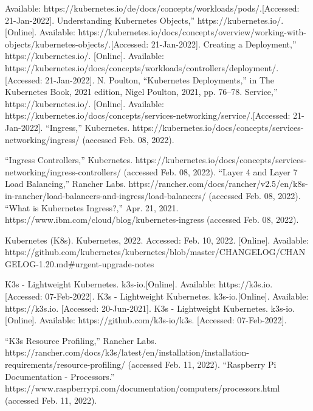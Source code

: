\begin{thebibliography}{10}
  Available: https://kubernetes.io/de/docs/concepts/workloads/pods/.[Accessed: 21-Jan-2022].
   Understanding Kubernetes Objects,” https://kubernetes.io/. [Online]. 
  Available: https://kubernetes.io/docs/concepts/overview/working-with-objects/kubernetes-objects/.[Accessed: 21-Jan-2022].  
   Creating a Deployment,” https://kubernetes.io/. [Online]. 
  Available: https://kubernetes.io/docs/concepts/workloads/controllers/deployment/.[Accessed: 21-Jan-2022].
   N. Poulton, “Kubernetes Deployments,” in The Kubernetes Book, 2021 edition, Nigel Poulton, 2021, pp. 76–78. 
   Service,” https://kubernetes.io/. [Online]. 
  Available: https://kubernetes.io/docs/concepts/services-networking/service/.[Accessed: 21-Jan-2022].
  “Ingress,” Kubernetes. https://kubernetes.io/docs/concepts/services-networking/ingress/ (accessed Feb. 08, 2022).

  “Ingress Controllers,” Kubernetes. https://kubernetes.io/docs/concepts/services-networking/ingress-controllers/ (accessed Feb. 08, 2022).
  “Layer 4 and Layer 7 Load Balancing,” Rancher Labs. https://rancher.com/docs/rancher/v2.5/en/k8s-in-rancher/load-balancers-and-ingress/load-balancers/ (accessed Feb. 08, 2022).
  “What is Kubernetes Ingress?,” Apr. 21, 2021. https://www.ibm.com/cloud/blog/kubernetes-ingress (accessed Feb. 08, 2022).


   Kubernetes (K8s). Kubernetes, 2022. Accessed: Feb. 10, 2022. [Online]. Available: https://github.com/kubernetes/kubernetes/blob/master/CHANGELOG/CHANGELOG-1.20.md\#urgent-upgrade-notes




   K3s - Lightweight Kubernetes. k3s-io.[Online]. Available: https://k3s.io. [Accessed: 07-Feb-2022].
   K3s - Lightweight Kubernetes. k3s-io.[Online]. Available: https://k3s.io. [Accessed: 20-Jun-2021].
   K3s - Lightweight Kubernetes. k3s-io.[Online]. Available: https://github.com/k3s-io/k3s. [Accessed: 07-Feb-2022].


  “K3s Resource Profiling,” Rancher Labs. https://rancher.com/docs/k3s/latest/en/installation/installation-requirements/resource-profiling/ (accessed Feb. 11, 2022).
  “Raspberry Pi Documentation - Processors.” https://www.raspberrypi.com/documentation/computers/processors.html (accessed Feb. 11, 2022).



\end{thebibliography}
